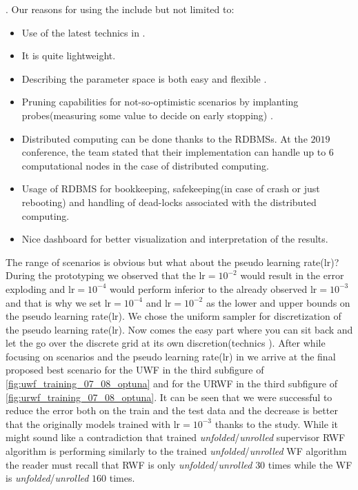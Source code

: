 \optuna\cite{Akiba2019}\index{\optuna}. Our reasons for using the \optuna\cite{Akiba2019}\index{\optuna} include but not limited to:
\begin{itemize}
  \item Use of the latest technics in \ho\cite{Hutter2019}\cite{Akiba2019}\index{\ho}.
  \item It is quite lightweight.
  \item Describing the parameter space is both easy and flexible \cite{Akiba2019}.
  \item Pruning capabilities for not-so-optimistic scenarios by implanting probes(measuring some value to decide on early stopping) \cite{Akiba2019}.
  \item Distributed computing can be done thanks to the \ac{RDBMS}s. At the $2019$ \scipy conference, the \optuna team stated that their implementation can handle up to $6$ computational nodes in the case of distributed computing.
  \item Usage of \ac{RDBMS} for bookkeeping, safekeeping(in case of crash or just rebooting) and handling of dead-locks associated with the distributed computing.
  \item Nice dashboard for better visualization and interpretation of the results.  
\end{itemize}
The range of scenarios is obvious but what about the pseudo learning rate($\mathrm{lr}$)? 
During the prototyping we observed that the $\mathrm{lr}=10^{-2}$ would result in the error exploding and $\mathrm{lr}=10^{-4}$ would perform 
inferior to the already observed $\mathrm{lr}=10^{-3}$ and that is why we set $\mathrm{lr}=10^{-4}$ and $\mathrm{lr}=10^{-2}$ 
as the lower and upper bounds on the pseudo learning rate($\mathrm{lr}$). We chose the uniform sampler for discretization of the pseudo learning rate($\mathrm{lr}$). 
Now comes the easy part where you can sit back and let the \optuna\cite{Akiba2019} go over the discrete grid at its own discretion(\ho technics \cite{Hutter2019}\cite{Akiba2019}).
After \ho\cite{Hutter2019}\cite{Akiba2019}\index{\ho} while focusing on scenarios and the pseudo learning rate($\mathrm{lr}$) in \adam\cite{Kingma2014} 
we arrive at the final proposed best scenario for the \ac{UWF} in the third subfigure of \cref{fig:uwf_training_07_08_optuna} and for the 
\ac{URWF} in the third subfigure of \cref{fig:urwf_training_07_08_optuna}. It can be seen that we were successful to reduce the error both on the train and the test data and the decrease is better that the originally models trained with $\mathrm{lr}=10^{-3}$ 
thanks to the \ho study. While it might sound like a contradiction that trained \emph{unfolded}/\emph{unrolled} supervisor \ac{RWF} algorithm
is performing similarly to the trained \emph{unfolded}/\emph{unrolled} \ac{WF} algorithm the reader must recall that \ac{RWF} is only \emph{unfolded}/\emph{unrolled} $30$ times while 
the \ac{WF} is \emph{unfolded}/\emph{unrolled} $160$ times. 

